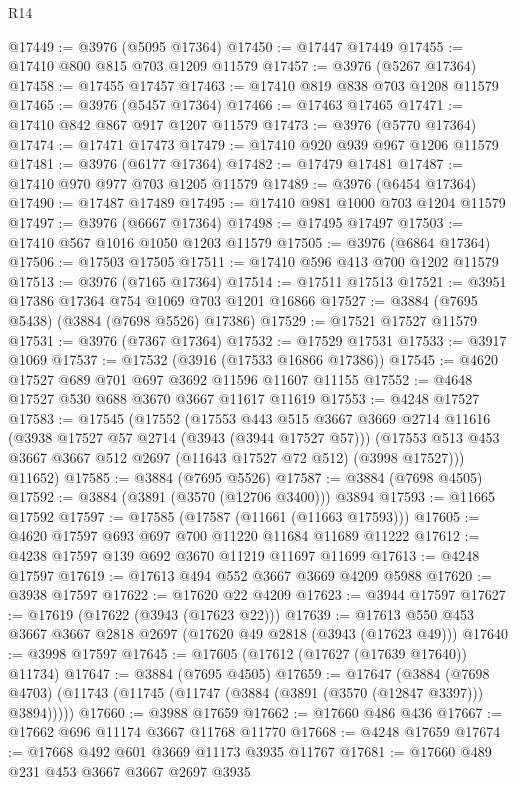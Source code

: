 \begin{lexlean}{R14}
\begin{coremodule}
@17449 := @3976 (@5095 @17364)
@17450 := @17447 @17449
@17455 := @17410 @800 @815 @703 @1209 @11579
@17457 := @3976 (@5267 @17364)
@17458 := @17455 @17457
@17463 := @17410 @819 @838 @703 @1208 @11579
@17465 := @3976 (@5457 @17364)
@17466 := @17463 @17465
@17471 := @17410 @842 @867 @917 @1207 @11579
@17473 := @3976 (@5770 @17364)
@17474 := @17471 @17473
@17479 := @17410 @920 @939 @967 @1206 @11579
@17481 := @3976 (@6177 @17364)
@17482 := @17479 @17481
@17487 := @17410 @970 @977 @703 @1205 @11579
@17489 := @3976 (@6454 @17364)
@17490 := @17487 @17489
@17495 := @17410 @981 @1000 @703 @1204 @11579
@17497 := @3976 (@6667 @17364)
@17498 := @17495 @17497
@17503 := @17410 @567 @1016 @1050 @1203 @11579
@17505 := @3976 (@6864 @17364)
@17506 := @17503 @17505
@17511 := @17410 @596 @413 @700 @1202 @11579
@17513 := @3976 (@7165 @17364)
@17514 := @17511 @17513
@17521 := @3951 @17386 @17364 @754 @1069 @703 @1201 @16866
@17527 := @3884 (@7695 @5438) (@3884 (@7698 @5526) @17386)
@17529 := @17521 @17527 @11579
@17531 := @3976 (@7367 @17364)
@17532 := @17529 @17531
@17533 := @3917 @1069
@17537 := @17532 (@3916 (@17533 @16866 @17386))
@17545 := @4620 @17527 @689 @701 @697 @3692 @11596 @11607 @11155
@17552 := @4648 @17527 @530 @688 @3670 @3667 @11617 @11619
@17553 := @4248 @17527
@17583 := @17545
    (@17552
      (@17553
        @443
        @515
        @3667
        @3669
        @2714
        @11616
        (@3938 @17527 @57 @2714 (@3943 (@3944 @17527 @57)))
        (@17553 @513 @453 @3667 @3667 @512 @2697 (@11643 @17527 @72 @512) (@3998 @17527)))
      @11652)
@17585 := @3884 (@7695 @5526)
@17587 := @3884 (@7698 @4505)
@17592 := @3884 (@3891 (@3570 (@12706 @3400))) @3894
@17593 := @11665 @17592
@17597 := @17585 (@17587 (@11661 (@11663 @17593)))
@17605 := @4620 @17597 @693 @697 @700 @11220 @11684 @11689 @11222
@17612 := @4238 @17597 @139 @692 @3670 @11219 @11697 @11699
@17613 := @4248 @17597
@17619 := @17613 @494 @552 @3667 @3669 @4209 @5988
@17620 := @3938 @17597
@17622 := @17620 @22 @4209
@17623 := @3944 @17597
@17627 := @17619 (@17622 (@3943 (@17623 @22)))
@17639 := @17613 @550 @453 @3667 @3667 @2818 @2697 (@17620 @49 @2818 (@3943 (@17623 @49)))
@17640 := @3998 @17597
@17645 := @17605 (@17612 (@17627 (@17639 @17640)) @11734)
@17647 := @3884 (@7695 @4505)
@17659 := @17647
    (@3884 (@7698 @4703) (@11743 (@11745 (@11747 (@3884 (@3891 (@3570 (@12847 @3397))) @3894)))))
@17660 := @3988 @17659
@17662 := @17660 @486 @436
@17667 := @17662 @696 @11174 @3667 @11768 @11770
@17668 := @4248 @17659
@17674 := @17668 @492 @601 @3669 @11173 @3935 @11767
@17681 := @17660 @489 @231 @453 @3667 @3667 @2697 @3935

\end{coremodule}
\end{lexlean}
